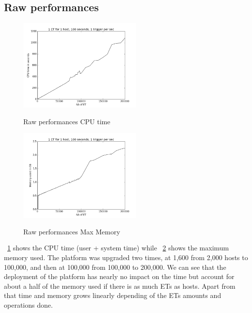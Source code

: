 \documentclass[a4paper, onecolumn]{article}
\begin{document}
  \subsection{Raw performances} \label{raw_perf}
    \begin{figure}
      \caption{Raw performances CPU time}
      \centering
      \includegraphics[width=0.55\textwidth]{../plots/raw_perf_time}
      \label{time_raw}
    \end{figure}
    \begin{figure}
      \caption{Raw performances Max Memory}
      \centering
      \includegraphics[width=0.55\textwidth]{../plots/raw_perf_mem}
      \label{mem_raw}
    \end{figure}
    
    \figurename~\ref{time_raw} shows the CPU time (user + system time) while 
    \figurename~\ref{mem_raw} shows the maximum memory used. The platform was
    upgraded two times, at 1,600 from 2,000 hosts to 100,000, and then at
    100,000 from 100,000 to 200,000. We can see that the deployment of the 
    platform has nearly no impact on the time but account for about a half of 
    the memory used if there is as much ETs as hosts. Apart from that time and 
    memory grows linearly depending of the ETs amounts and operations done.
    
    
\end{document}
